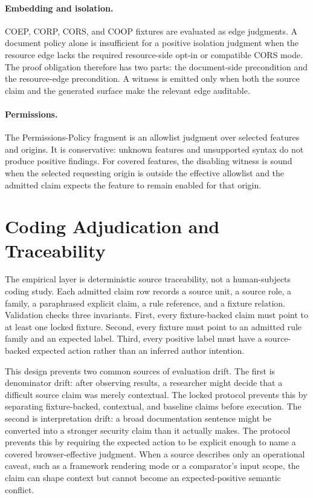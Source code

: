 \documentclass[10pt,conference]{IEEEtran}
\begin{document}
\paragraph{Embedding and isolation.}
COEP, CORP, CORS, and COOP fixtures are evaluated as edge judgments. A document policy alone is insufficient for a positive isolation judgment when the resource edge lacks the required resource-side opt-in or compatible CORS mode. The proof obligation therefore has two parts: the document-side precondition and the resource-edge precondition. A witness is emitted only when both the source claim and the generated surface make the relevant edge auditable.

\paragraph{Permissions.}
The Permissions-Policy fragment is an allowlist judgment over selected features and origins. It is conservative: unknown features and unsupported syntax do not produce positive findings. For covered features, the disabling witness is sound when the selected requesting origin is outside the effective allowlist and the admitted claim expects the feature to remain enabled for that origin.

\section{Coding Adjudication and Traceability}

The empirical layer is deterministic source traceability, not a human-subjects coding study. Each admitted claim row records a source unit, a source role, a family, a paraphrased explicit claim, a rule reference, and a fixture relation. Validation checks three invariants. First, every fixture-backed claim must point to at least one locked fixture. Second, every fixture must point to an admitted rule family and an expected label. Third, every positive label must have a source-backed expected action rather than an inferred author intention.

This design prevents two common sources of evaluation drift. The first is denominator drift: after observing results, a researcher might decide that a difficult source claim was merely contextual. The locked protocol prevents this by separating fixture-backed, contextual, and baseline claims before execution. The second is interpretation drift: a broad documentation sentence might be converted into a stronger security claim than it actually makes. The protocol prevents this by requiring the expected action to be explicit enough to name a covered browser-effective judgment. When a source describes only an operational caveat, such as a framework rendering mode or a comparator's input scope, the claim can shape context but cannot become an expected-positive semantic conflict.
\end{document}
